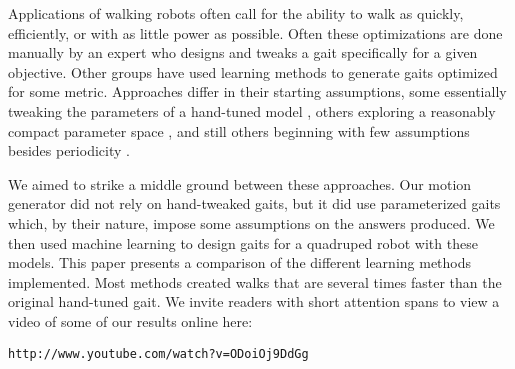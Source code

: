 Applications of walking robots often call for the ability to walk as
quickly, efficiently, or with as little power as possible.  Often
these optimizations are done manually by an expert who designs and
tweaks a gait specifically for a given objective.  Other groups have
used learning methods to generate gaits optimized for some metric.
Approaches differ in their starting assumptions, some essentially
tweaking the parameters of a hand-tuned model \cite{chernova}, others
exploring a reasonably compact parameter space \cite{kohl}, and still
others beginning with few assumptions besides periodicity
\cite{zykov}.

We aimed to strike a middle ground between these approaches.  Our
motion generator did not rely on hand-tweaked gaits, but it did use
parameterized gaits which, by their nature, impose some assumptions on
the answers produced.  We then used machine learning to design gaits
for a quadruped robot with these models.  This paper presents a
comparison of the different learning methods implemented.  Most
methods created walks that are several times faster than the original
hand-tuned gait.  We invite readers with short attention spans to view
a video of some of our results online here:

\texttt{http://www.youtube.com/watch?v=ODoiOj9DdGg}

